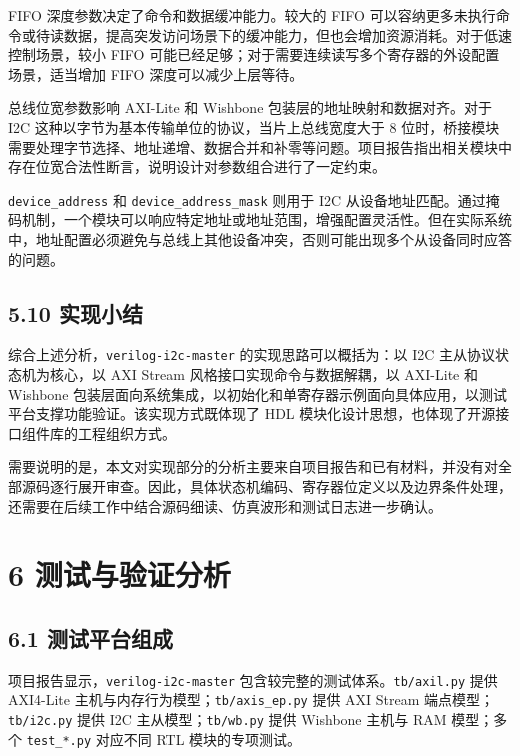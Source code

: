FIFO 深度参数决定了命令和数据缓冲能力。较大的 FIFO 可以容纳更多未执行命令或待读数据，提高突发访问场景下的缓冲能力，但也会增加资源消耗。对于低速控制场景，较小 FIFO 可能已经足够；对于需要连续读写多个寄存器的外设配置场景，适当增加 FIFO 深度可以减少上层等待。

总线位宽参数影响 AXI-Lite 和 Wishbone 包装层的地址映射和数据对齐。对于 I2C 这种以字节为基本传输单位的协议，当片上总线宽度大于 8 位时，桥接模块需要处理字节选择、地址递增、数据合并和补零等问题。项目报告指出相关模块中存在位宽合法性断言，说明设计对参数组合进行了一定约束。

\texttt{device\_address} 和 \texttt{device\_address\_mask} 则用于 I2C 从设备地址匹配。通过掩码机制，一个模块可以响应特定地址或地址范围，增强配置灵活性。但在实际系统中，地址配置必须避免与总线上其他设备冲突，否则可能出现多个从设备同时应答的问题。

\subsection{5.10 实现小结}\label{ux5b9eux73b0ux5c0fux7ed3}

综合上述分析，\texttt{verilog-i2c-master} 的实现思路可以概括为：以 I2C 主从协议状态机为核心，以 AXI Stream 风格接口实现命令与数据解耦，以 AXI-Lite 和 Wishbone 包装层面向系统集成，以初始化和单寄存器示例面向具体应用，以测试平台支撑功能验证。该实现方式既体现了 HDL 模块化设计思想，也体现了开源接口组件库的工程组织方式。

需要说明的是，本文对实现部分的分析主要来自项目报告和已有材料，并没有对全部源码逐行展开审查。因此，具体状态机编码、寄存器位定义以及边界条件处理，还需要在后续工作中结合源码细读、仿真波形和测试日志进一步确认。

\section{6 测试与验证分析}\label{ux6d4bux8bd5ux4e0eux9a8cux8bc1ux5206ux6790}

\subsection{6.1 测试平台组成}\label{ux6d4bux8bd5ux5e73ux53f0ux7ec4ux6210}

项目报告显示，\texttt{verilog-i2c-master} 包含较完整的测试体系。\texttt{tb/axil.py} 提供 AXI4-Lite 主机与内存行为模型；\texttt{tb/axis\_ep.py} 提供 AXI Stream 端点模型；\texttt{tb/i2c.py} 提供 I2C 主从模型；\texttt{tb/wb.py} 提供 Wishbone 主机与 RAM 模型；多个 \texttt{test\_*.py} 对应不同 RTL 模块的专项测试。

